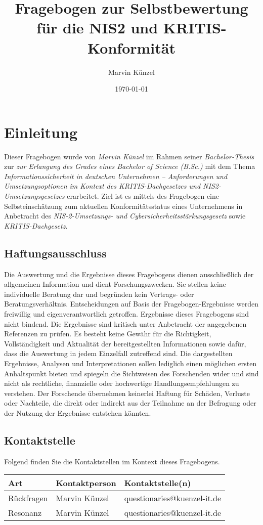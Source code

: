 \documentclass[a4paper,11pt,twoside]{article} %
\title{Fragebogen zur Selbstbewertung für die NIS2 und KRITIS-Konformität}
\author{Marvin Künzel}
\date{\today}
\begin{document}
\maketitle
\thispagestyle{plain} %
\section{Einleitung}
Dieser Fragebogen wurde von \emph{Marvin Künzel} im Rahmen seiner \emph{Bachelor-Thesis} zur \emph{zur Erlangung des Grades eines Bachelor of Science (B.Sc.)} mit dem Thema \emph{Informationssicherheit in deutschen Unternehmen – Anforderungen und Umsetzungsoptionen im Kontext des KRITIS-Dachgesetzes und NIS2-Umsetzungsgesetzes} erarbeitet. Ziel ist es mittels des Fragebogen eine Selbsteinschätzung zum aktuellen Konformitätsstatus eines Unternehmens in Anbetracht des \emph{NIS-2-Umsetzungs- und Cybersicherheitsstärkungsgesetz} sowie \emph{KRITIS-Dachgesetz}.
\subsection{Haftungsausschluss}
Die Auswertung und die Ergebnisse dieses Fragebogens dienen ausschließlich der allgemeinen Information und dient Forschungszwecken. Sie stellen keine individuelle Beratung dar und begründen kein Vertrags- oder Beratungsverhältnis. Entscheidungen auf Basis der Fragebogen-Ergebnisse werden freiwillig und eigenverantwortlich getroffen. Ergebnisse dieses Fragebogens sind nicht bindend. Die Ergebnisse sind kritisch unter Anbetracht der angegebenen Referenzen zu prüfen. Es besteht keine Gewähr für die Richtigkeit, Vollständigkeit und Aktualität der bereitgestellten Informationen sowie dafür, dass die Auswertung in jedem Einzelfall zutreffend sind. Die dargestellten Ergebnisse, Analysen und Interpretationen sollen lediglich einen möglichen ersten Anhaltspunkt bieten und spiegeln die Sichtweisen des Forschenden wider und sind nicht als rechtliche, finanzielle oder hochwertige Handlungsempfehlungen zu verstehen. Der Forschende übernehmen keinerlei Haftung für Schäden, Verluste oder Nachteile, die direkt oder indirekt aus der Teilnahme an der Befragung oder der Nutzung der Ergebnisse entstehen könnten.
\subsection{Kontaktstelle}
Folgend finden Sie die Kontaktstellen im Kontext dieses Fragebogens.
\begin{table}[h!]
\centering
\begin{tabular}{lll}
\textbf{Art} & \textbf{Kontaktperson} & \textbf{Kontaktstelle(n)}   \\ \hline
Rückfragen   & Marvin Künzel          & questionaries@kuenzel-it.de \\ \hline
Resonanz     & Marvin Künzel          & questionaries@kuenzel-it.de \\
\end{tabular}
\end{table}
\end{document}
